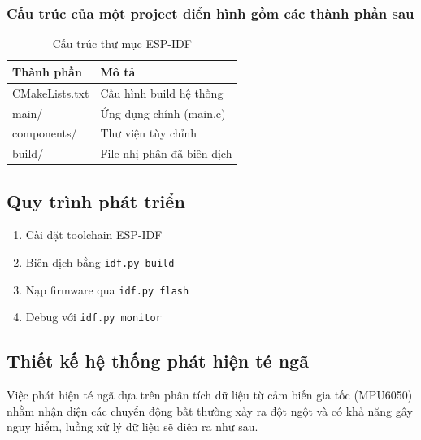 \documentclass[a4paper,12pt]{report}
\begin{document}
	\subsubsection{Cấu trúc của một project điển hình gồm các thành phần sau}
	\begin{table}[h]
		\centering
		\caption{Cấu trúc thư mục ESP-IDF}
		\begin{tabular}{|l|l|}
			\hline
			\textbf{Thành phần} & \textbf{Mô tả} \\ \hline
			CMakeLists.txt & Cấu hình build hệ thống \\ \hline
			main/ & Ứng dụng chính (main.c) \\ \hline
			components/ & Thư viện tùy chỉnh \\ \hline
			build/ & File nhị phân đã biên dịch \\ \hline
		\end{tabular}
	\end{table}
	
	\newpage
	
	\subsection{Quy trình phát triển}
	\begin{enumerate}
		\item Cài đặt toolchain ESP-IDF
		\item Biên dịch bằng \texttt{idf.py build}
		\item Nạp firmware qua \texttt{idf.py flash}
		\item Debug với \texttt{idf.py monitor}
	\end{enumerate}
	
	\subsection{Thiết kế hệ thống phát hiện té ngã}
	Việc phát hiện té ngã dựa trên phân tích dữ liệu từ cảm biến gia tốc (MPU6050) nhằm nhận diện các chuyển động bất thường xảy ra đột ngột và có khả năng gây nguy hiểm, luồng xử lý dữ liệu sẽ diên ra như sau.
	
\end{document}
